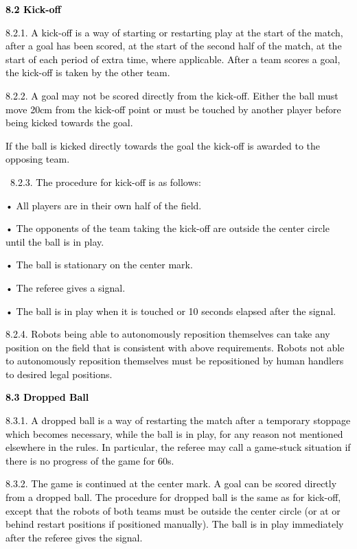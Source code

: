 \documentclass[a4paper]{article}
\begin{document}
\textbf{\textcolor{black}{8.2 Kick-off}}

\textcolor{black}{8.2.1. A kick-off is a way of starting or restarting play at the start of the match, after a goal has
been scored, at the start of the second half of the match, at the start of each period of extra time, where applicable.
After a team scores a goal, the kick-off is taken by the other team.}

\textcolor{black}{8.2.2. A goal may not be scored directly from the kick-off. Either the ball must move 20cm from the
kick-off point or must be touched by another player before being kicked towards the goal.}

\textcolor{black}{If the ball is kicked directly towards the goal the kick-off is awarded to the opposing team.}

\textcolor{black}{\ 8.2.3. The procedure for kick-off is as follows: }

\textcolor{black}{• All players are in their own half of the field. }

\textcolor{black}{• The opponents of the team taking the kick-off are outside the center circle until the ball is in
play.}

\textcolor{black}{• The ball is stationary on the center mark. }

\textcolor{black}{• The referee gives a signal.}

\textcolor{black}{• The ball is in play when it is touched or 10 seconds elapsed after the signal.}

\textcolor{black}{8.2.4. Robots being able to autonomously reposition themselves can take any position on the field that
is consistent with above requirements. Robots not able to autonomously reposition themselves must be repositioned by
human handlers to desired legal positions. }

\textbf{\textcolor{black}{8.3 Dropped Ball}}

\textcolor{black}{8.3.1. A dropped ball is a way of restarting the match after a temporary stoppage which becomes
necessary, while the ball is in play, for any reason not mentioned elsewhere in the rules. In particular, the referee
may call a game-stuck situation if there is no progress of the game for 60s.}

\textcolor{black}{8.3.2. The game is continued at the center mark. A goal can be scored directly from a dropped ball.
The procedure for dropped ball is the same as for kick-off, except that the robots of both teams must be outside the
center circle (or at or behind restart positions if positioned manually). The ball is in play immediately after the
referee gives the signal.}
\end{document}
